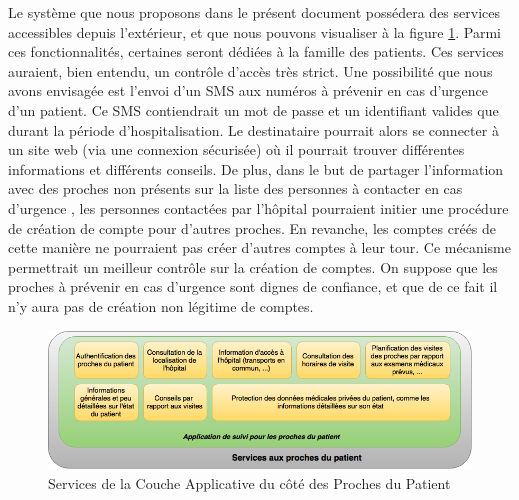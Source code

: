 Le système que nous proposons dans le présent document possédera des services accessibles depuis l'extérieur, et que nous pouvons visualiser à la figure \ref{famille}. Parmi ces
fonctionnalités, certaines seront dédiées à la famille des patients. Ces services auraient, bien entendu, un contrôle d'accès très
strict. Une possibilité que nous avons envisagée est l'envoi d'un SMS aux numéros à prévenir en cas d'urgence d'un patient. Ce
SMS contiendrait un mot de passe et un identifiant valides que durant la période d'hospitalisation. Le destinataire pourrait alors
se connecter à un site web (via une connexion sécurisée) où il pourrait trouver différentes informations et différents conseils. 
De plus, dans le but de partager l'information avec des proches non présents sur la liste des personnes à contacter en cas d'urgence
, les personnes contactées par l'hôpital pourraient initier une procédure de création de compte pour d'autres proches. En revanche,
les comptes créés de cette manière ne pourraient pas créer d'autres comptes à leur tour. Ce mécanisme permettrait un meilleur contrôle
sur la création de comptes. On suppose que les proches à prévenir en cas d'urgence sont dignes de confiance, et que de ce fait
il n'y aura pas de création non légitime de comptes.
\newline
\begin{figure}[h!]
	\hspace*{-2.5cm}
	\centering
	\includegraphics[width=1.4\textwidth]{famille.png}
	\caption{Services de la Couche Applicative du côté des Proches du Patient}
	\label{famille}
\end{figure}

